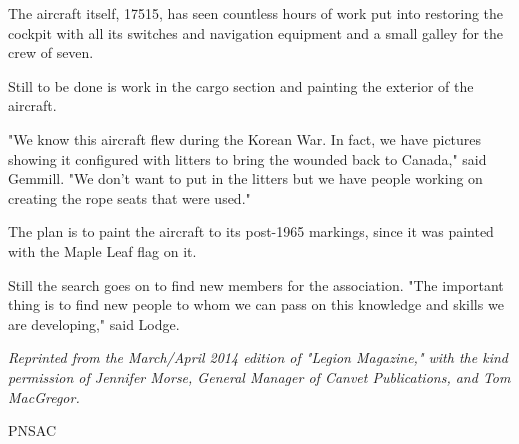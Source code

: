 The aircraft itself, 17515, has seen countless hours of work put into
restoring the cockpit with all its switches and navigation
equipment and a small galley for the crew of seven.

Still to be done is work in the cargo section and painting the
exterior of the aircraft.

"We know this aircraft flew during the Korean War. In fact, we have 
pictures showing it configured with litters to bring the wounded back to
Canada," said Gemmill. "We don't want to put in the litters but we
have people working on creating the rope seats that were used."

The plan is to paint the aircraft to its post-1965 markings, since it
was painted with the Maple Leaf flag on it.

Still the search goes on to find new members for the association. "The
important thing is to find new people to whom we can pass on this 
knowledge and skills we are developing," said Lodge.

\textit{Reprinted from the March/April 2014 edition of "Legion Magazine," with the kind permission of Jennifer Morse, General Manager of Canvet Publications, and Tom MacGregor.}












\begin{footnotesize}
    \raggedleft PNSAC\\
\end{footnotesize}



